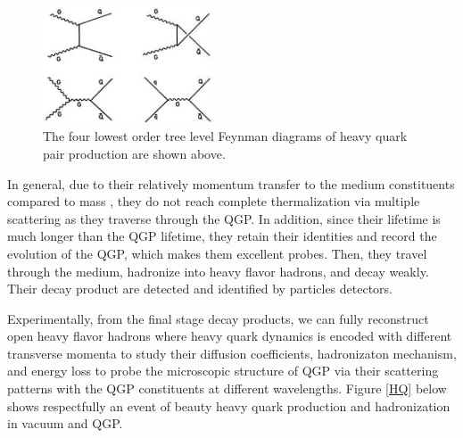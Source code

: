  \begin{figure}[hbtp]
\begin{center}
\includegraphics[width=0.45\textwidth]{Figures/Chapter1/HQDiagram.jpg}
\caption{The four lowest order tree level Feynman diagrams of heavy quark pair production are shown above.}
\label{HQProduce}
\end{center}
\end{figure}   

In general, due to their relatively momentum transfer to the medium constituents compared to mass \cite{}, they do not reach complete thermalization via multiple scattering as they traverse through the QGP. In addition, since their lifetime is much longer than the QGP lifetime, they retain their identities and record the evolution of the QGP, which makes them excellent probes. Then, they travel through the medium, hadronize into heavy flavor hadrons, and decay weakly. Their decay product are detected and identified by particles detectors.

Experimentally, from the final stage decay products, we can fully reconstruct open heavy flavor hadrons where heavy quark dynamics is encoded with different transverse momenta to study their diffusion coefficients, hadronizaton mechanism, and energy loss to probe the microscopic structure of QGP via their scattering patterns with the QGP constituents at different wavelengths. Figure \ref{HQ} below shows respectfully an event of beauty heavy quark production and hadronization in vacuum and QGP.


